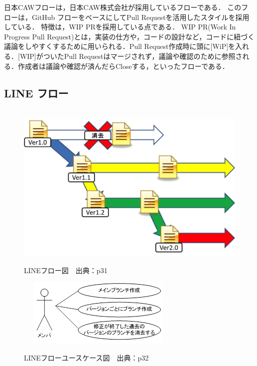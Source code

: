 日本CAWフローは，日本CAW株式会社が採用しているフローである．
このフローは，GitHub フローをベースにしてPull Requestを活用したスタイルを採用している．
特徴は，WIP PRを採用している点である．
WIP PR(Work In Progress Pull Request)とは，実装の仕方や，コードの設計など，コードに紐づく議論をしやすくするために用いられる．Pull Request作成時に頭に[WiP]を入れる．[WIP]がついたPull Requestはマージされず，議論や確認のために参照される．作成者は議論や確認が済んだらCloseする，といったフローである\cite{harada2014}．




\subsection{LINE フロー}

\begin{figure}[H]
\centering　
\includegraphics[width=13cm]{LINE.png}
\caption{LINEフロー図　出典：\cite{onodera2015}p31}\label{tab:LINE フロー}
\end{figure}
\begin{figure}[H]
\centering　
\includegraphics{lineyou.png}
\caption{LINEフローユースケース図　出典：\cite{onodera2015}p32}\label{tab:lineyou}
\end{figure}
